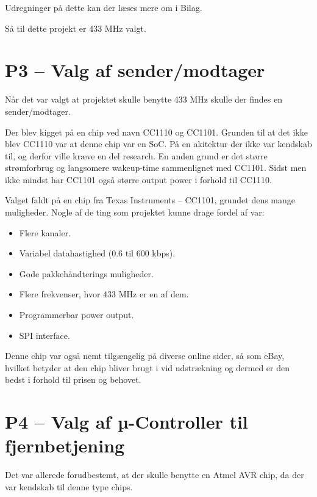 \documentclass[Main]{subfiles}
\begin{document}
Udregninger på dette kan der læses mere om i Bilag\cite{wireless}.

Så til dette projekt er 433 MHz valgt.




\section[Valg af sender/modtager]{P3 -- Valg af sender/modtager}

Når det var valgt at projektet skulle benytte 433 MHz skulle der findes en sender/modtager.

Der blev kigget på en chip ved navn CC1110 og CC1101. Grunden til at det ikke blev CC1110 var at denne chip var en SoC. På en akitektur der ikke var kendskab til, og derfor ville kræve en del research.
En anden grund er det større strømforbrug og langsomere wakeup-time sammenlignet med CC1101. Sidst men ikke mindst har CC1101 også større output power i forhold til CC1110.

Valget faldt på en chip fra Texas Instruments -- CC1101\cite{TI-cc1101}, grundet dens mange muligheder.
Nogle af de ting som projektet kunne drage fordel af var:

\vspace{-20pt}
\begin{itemize}
\item Flere kanaler.
\item Variabel datahastighed (0.6 til 600 kbps).
\item Gode pakkehåndterings muligheder. 
\item Flere frekvenser, hvor 433 MHz er en af dem.
\item Programmerbar power output.
\item SPI interface.
\end{itemize}

Denne chip var også nemt tilgængelig på diverse online sider, så som eBay\cite{eBay}, hvilket betyder at den chip bliver brugt i vid udstrækning og dermed er den bedst i forhold til prisen og behovet.




\section[Valg af µ-controller til fjernbetjening]{P4 -- Valg af µ-Controller til fjernbetjening}

Det var allerede forudbestemt, at der skulle benytte en Atmel AVR chip, da der var kendskab til denne type chips.
\end{document}
